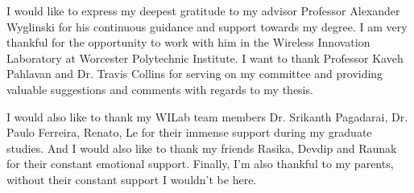 I would like to express my deepest gratitude to my advisor Professor Alexander Wyglinski for his continuous guidance and support towards my degree. I am very thankful for the opportunity to work with him in the Wireless Innovation Laboratory at Worcester Polytechnic Institute. I want to thank Professor Kaveh Pahlavan and Dr. Travis Collins for serving on my committee and providing valuable suggestions and comments with regards to my thesis. 

I would also like to thank my WILab team members Dr. Srikanth Pagadarai, Dr. Paulo Ferreira, Renato, Le for their immense support during my graduate studies. And I would also like to thank my friends Rasika, Devdip and Raunak for their constant emotional support. Finally, I'm also thankful to my parents, without their constant support I wouldn't be here.

 
